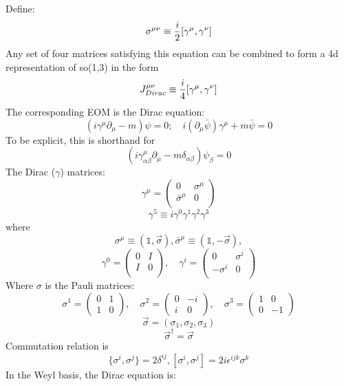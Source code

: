 Define:
\[
    \sigma^{\mu\nu} \equiv \frac{i}{2}[\gamma^{\mu}, \gamma^{\nu}]
    \]
Any set of four matrices satisfying this equation can be combined to form a
4d representation of so(1,3) in the form
\[
    J^{\mu\nu}_{Dirac} \equiv \frac{i}{4}[\gamma^\mu, \gamma^\nu]
    \]
The corresponding EOM is the Dirac equation:
$$ (i\gamma^{\mu}\partial_{\mu} - m) \psi =0;	\quad
i(\partial_{\mu}\bar{\psi})\gamma^{\mu} + m\bar{\psi} = 0$$
To be explicit, this is shorthand for
\[
    (i\gamma^\mu_{\alpha\beta}\partial_\mu-m\delta_{\alpha\beta})\psi_\beta = 0
    \]
    The Dirac ($\gamma$) matrices:
\[
    \gamma^{\mu} = 
    \begin{pmatrix}
	0   & \sigma^{\mu}  \\
	\bar{\sigma}^{\mu}  & 0	\\
    \end{pmatrix}
\]
\[
    \gamma^5\equiv{i}\gamma^0\gamma^1\gamma^2\gamma^3
    \]
where
\[
    \sigma^\mu\equiv(\mathds{1},\vec{\sigma}),
    \bar{\sigma}^\mu\equiv(\mathds{1},-\vec{\sigma}),
\]
\[ 
    \gamma^{0} = 
    \begin{pmatrix}
	0   & I	\\
	I   & 0	\\	
    \end{pmatrix}, \quad
    \gamma^{i} = 
    \begin{pmatrix}
	0   & \sigma^{i}    \\
	-\sigma^{i} & 0	    \\
    \end{pmatrix}
\]
Where \textbf{$\sigma$} is the Pauli matrices:
\begin{equation}
    \sigma^{1} = 
	\begin{pmatrix}
	    0	& 1 \\
	    1	& 0 
	\end{pmatrix},	\quad
    \sigma^{2} = 
	\begin{pmatrix}
	    0	& -i \\
	    i	& 0 
	\end{pmatrix},	\quad
    \sigma^{3} = 
	\begin{pmatrix}
	    1	& 0 \\
	    0	& -1 
	\end{pmatrix}
    \label{Pauli Matrices}
\end{equation}
\[  \vec{\sigma} = (\sigma_1, \sigma_2, \sigma_3)   \]
\[  \vec{\sigma}^\dag=\vec{\sigma}\]
Commutation relation is
\[  
    \{\sigma^i, \sigma^j\} = 2\delta^{ij}, 
    [\sigma^i, \sigma^j] = 2i\epsilon^{ijk}\sigma^k	\]
In the Weyl basis, the Dirac equation is:
